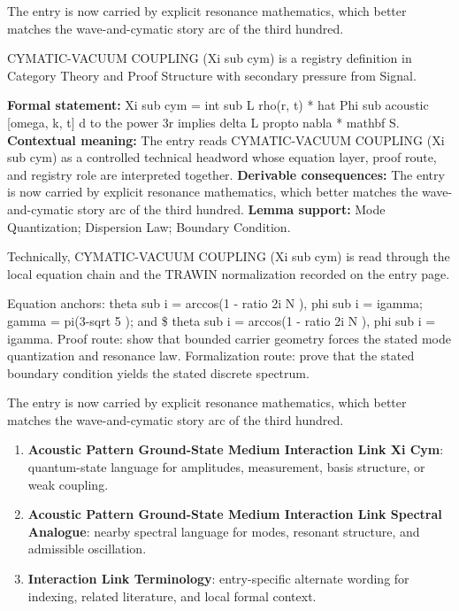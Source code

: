 The entry is now carried by explicit resonance mathematics, which better matches the wave-and-cymatic story arc of the third hundred.
\clearpage


\begingroup\small
{}
CYMATIC-VACUUM COUPLING (Xi sub cym) is a registry definition in Category Theory and Proof Structure with secondary pressure from Signal.

\begingroup\footnotesize\setlength{\emergencystretch}{3em}\sloppy
\textbf{Formal statement:} Xi sub cym = int sub L rho(r, t) * hat Phi sub acoustic [omega, k, t] d to the power 3r implies delta L propto nabla * mathbf S. \textbf{Contextual meaning:} The entry reads CYMATIC-VACUUM COUPLING (Xi sub cym) as a controlled technical headword whose equation layer, proof route, and registry role are interpreted together. \textbf{Derivable consequences:} The entry is now carried by explicit resonance mathematics, which better matches the wave-and-cymatic story arc of the third hundred. \textbf{Lemma support:} Mode Quantization; Dispersion Law; Boundary Condition.\par
\endgroup

Technically, CYMATIC-VACUUM COUPLING (Xi sub cym) is read through the local equation chain and the TRAWIN normalization recorded on the entry page.

Equation anchors: theta sub i = arccos(1 - ratio 2i N ), phi sub i = igamma; gamma = pi(3-sqrt 5 ); and \$ theta sub i = arccos(1 - ratio 2i N ), phi sub i = igamma. Proof route: show that bounded carrier geometry forces the stated mode quantization and resonance law. Formalization route: prove that the stated boundary condition yields the stated discrete spectrum.

The entry is now carried by explicit resonance mathematics, which better matches the wave-and-cymatic story arc of the third hundred.
\endgroup

\begin{enumerate}[leftmargin=1.6em,itemsep=6pt,topsep=4pt]
\item \textbf{Acoustic Pattern Ground-State Medium Interaction Link Xi Cym}: quantum-state language for amplitudes, measurement, basis structure, or weak coupling.
\item \textbf{Acoustic Pattern Ground-State Medium Interaction Link Spectral Analogue}: nearby spectral language for modes, resonant structure, and admissible oscillation.
\item \textbf{Interaction Link Terminology}: entry-specific alternate wording for indexing, related literature, and local formal context.
\end{enumerate}

